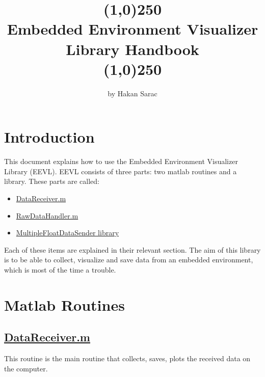 \documentclass{article}
\author{by \hisfont Hakan Sarac}
\date{}
\begin{document}
\title{\line(1,0){250}\\\myfont Embedded Environment Visualizer Library Handbook \\\line(1,0){250}}
\maketitle
\newpage
\tableofcontents
\newpage


\section{Introduction}


This document explains how to use the Embedded Environment Visualizer Library (EEVL). EEVL consists of three parts: two matlab routines and a library. These parts are called:
\begin{itemize}
	\item \href{https://github.com/hakansrc/fault_tolerant_drives/blob/master/Software/MultipleDataPlot/DataReceiver.m}{DataReceiver.m}
	\item \href{https://github.com/hakansrc/fault_tolerant_drives/blob/master/Software/MultipleDataPlot/RawDataHandler.m}{RawDataHandler.m}
	\item \href{https://github.com/hakansrc/fault_tolerant_drives/tree/master/Software/MultipleDataPlot/MultipleFloatDataSender}{MultipleFloatDataSender library}
\end{itemize}

Each of these items are explained in their relevant section.
\newline
The aim of this library is to be able to collect, visualize and save data from an embedded environment, which is most of the time a trouble. 



\section{Matlab Routines} 
\subsection{\href{https://github.com/hakansrc/fault_tolerant_drives/blob/master/Software/MultipleDataPlot/DataReceiver.m}{DataReceiver.m}} 

This routine is the main routine that collects, saves, plots the received data on the computer. 
\end{document}
